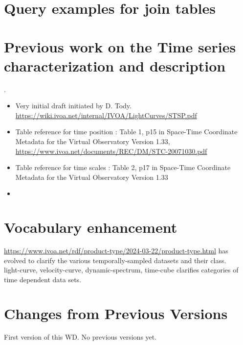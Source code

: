 \documentclass[11pt,a4paper]{ivoa}
\begin{document}


  
\appendix

 

\section{Query examples for join tables}\label{sec:query_examples}

\section{Previous work on the Time series characterization and description}. 

\begin{itemize}  
\item Very initial draft initiated by D. Tody. \url{https://wiki.ivoa.net/internal/IVOA/LightCurves/STSP.pdf}
\item Table reference for time position : Table 1, p15 in Space-Time Coordinate Metadata for the Virtual Observatory
Version 1.33, \url{https://www.ivoa.net/documents/REC/DM/STC-20071030.pdf} 
\item Table reference for time scales :  Table 2, p17 in Space-Time Coordinate Metadata for the Virtual Observatory
Version 1.33
\item 
\end{itemize} 

\section{Vocabulary enhancement}
 \url{https://www.ivoa.net/rdf/product-type/2024-03-22/product-type.html}
has evolved to clarify the various temporally-sampled datasets and their class.\\
light-curve, velocity-curve, dynamic-spectrum, time-cube clarifies categories of time dependent data sets.

\section{Changes from Previous Versions}

First version of this WD.
No previous versions yet.
\end{document}
